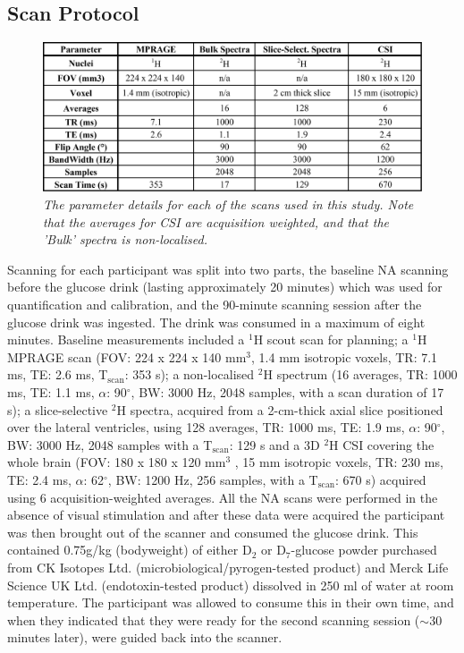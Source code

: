 \subsection{Scan Protocol}

\begin{figure}
    \centering
    \includegraphics[width = 1\textwidth]{Figures/Glucose/Scan_Details.png}
    \caption{\textit{The parameter details for each of the scans used in this study. Note that the averages for CSI are acquisition weighted, and that the 'Bulk' spectra is non-localised.}}
    \label{fig:Glu:Scan_Details}
\end{figure}

Scanning for each participant was split into two parts, the baseline \ac{NA} scanning before the glucose drink (lasting approximately 20 minutes) which was used for quantification and calibration, and the 90-minute scanning session after the glucose drink was ingested. The drink was consumed in a maximum of eight minutes. Baseline measurements included a $^1$H scout scan for planning; a $^1$H \ac{MPRAGE} scan (\ac{FOV}: 224 x 224 x 140 mm$^3$, 1.4 mm isotropic voxels, \ac{TR}: 7.1 ms, \ac{TE}: 2.6 ms, T$_\text{scan}$: 353 s); a non-localised $^2$H spectrum (16 averages, \ac{TR}: 1000 ms, \ac{TE}: 1.1 ms, $\alpha$: 90$^\circ$, \ac{BW}: 3000 Hz, 2048 samples, with a scan duration of 17 s); a slice-selective $^2$H spectra, acquired from a 2-cm-thick axial slice positioned over the lateral ventricles, using 128 averages, TR: 1000 ms, TE: 1.9 ms, $\alpha$: 90$^\circ$, \ac{BW}: 3000 Hz,  2048 samples with a T$_\text{scan}$: 129 s and a 3D $^2$H \ac{CSI} covering the whole brain (\ac{FOV}: 180 x 180 x 120 mm$^3$ , 15 mm isotropic voxels, \ac{TR}: 230 ms, \ac{TE}: 2.4 ms, $\alpha$: 62$^\circ$, \ac{BW}: 1200 Hz, 256 samples, with a T$_\text{scan}$: 670 s) acquired using 6 acquisition-weighted \cite{Pohmann2001AccurateCSI} averages. All the \ac{NA} scans were performed in the absence of visual stimulation and after these data were acquired the participant was then brought out of the scanner and consumed the glucose drink. This contained 0.75g/kg (bodyweight) of either D$_2$ or D$_7$-glucose powder purchased from CK Isotopes Ltd. (microbiological/pyrogen-tested product) and Merck Life Science UK Ltd. (endotoxin-tested product) dissolved in 250 ml of water at room temperature. The participant was allowed to consume this in their own time, and when they indicated that they were ready for the second scanning session ($\sim$30 minutes later), were guided back into the scanner.

